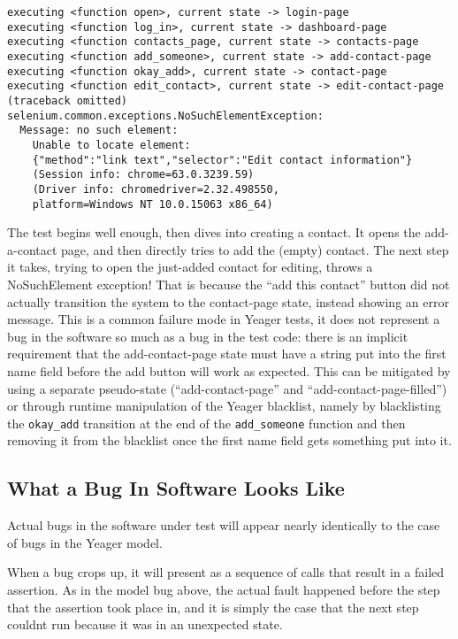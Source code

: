 \begin{Verbatim}[fontsize=\small, baselinestretch=0.75]
executing <function open>, current state -> login-page
executing <function log_in>, current state -> dashboard-page
executing <function contacts_page, current state -> contacts-page
executing <function add_someone>, current state -> add-contact-page
executing <function okay_add>, current state -> contact-page
executing <function edit_contact>, current state -> edit-contact-page
(traceback omitted)
selenium.common.exceptions.NoSuchElementException:
  Message: no such element:
    Unable to locate element:
    {"method":"link text","selector":"Edit contact information"}
    (Session info: chrome=63.0.3239.59)
    (Driver info: chromedriver=2.32.498550,
    platform=Windows NT 10.0.15063 x86_64)
\end{Verbatim}

The test begins well enough, then dives into creating a contact. It opens the add-a-contact page, and then directly tries to add the (empty) contact. The next step it takes, trying to open the just-added contact for editing, throws a NoSuchElement exception! That is because the  ``add this contact'' button did not actually transition the system to the contact-page state, instead showing an error message. This is a common failure mode in Yeager tests, it does not represent a bug in the software so much as a bug in the test code: there is an implicit requirement that the add-contact-page state must have a string put into the first name field before the add button will work as expected. This can be mitigated by using a separate pseudo-state (``add-contact-page'' and ``add-contact-page-filled'') or through runtime manipulation of the Yeager blacklist, namely by blacklisting the \texttt{okay\_add} transition at the end of the \texttt{add\_someone} function and then removing it from the blacklist once the first name field gets something put into it.

\subsection{What a Bug In Software Looks Like}
Actual bugs in the software under test will appear nearly identically to the case of bugs in the Yeager model.

When a bug crops up, it will present as a sequence of calls that result in a failed assertion. As in the model bug above, the actual fault happened before the step that the assertion took place in, and it is simply the case that the next step couldnt run because it was in an unexpected state.

